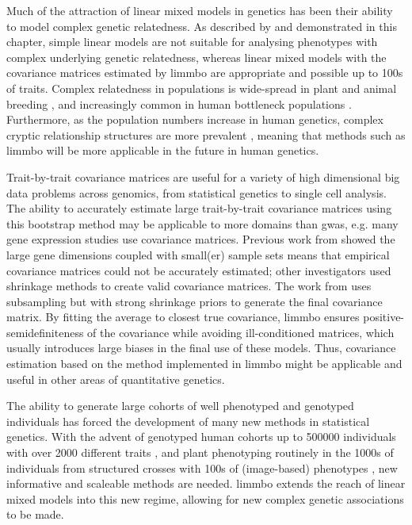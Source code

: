 Much of the attraction of linear mixed models in genetics has been their ability to model complex genetic relatedness. As described by \citep{Kang2010} and demonstrated in this chapter, simple linear models are not suitable for analysing phenotypes with complex underlying genetic relatedness, whereas linear mixed models with the covariance matrices estimated by \gls{limmbo} are appropriate and possible up to \num{100}s of traits. Complex relatedness in populations is wide-spread in plant and animal breeding \citep{Bolormaa2014,Yang2014}, and increasingly common in human bottleneck populations \citep{Tachmazidou2013}. Furthermore, as the population numbers increase in human genetics, complex cryptic relationship structures are more prevalent \citep{Reich2001}, meaning that methods such as \gls{limmbo} will be more applicable in the future in human genetics. 

Trait-by-trait covariance matrices are useful for a variety of high dimensional big data problems across genomics, from statistical genetics to single cell analysis. The ability to accurately estimate large trait-by-trait covariance matrices using this bootstrap method may be applicable to more domains than \gls{gwas}, e.g. many gene expression studies use covariance matrices. Previous work from \citet{Schaefer2005} showed the large gene dimensions coupled with small(er) sample sets means that empirical covariance matrices could not be accurately estimated; other investigators \citep{Ledoit2004,Furrer2007,Bickel2008} used shrinkage methods to create valid covariance matrices. The work from \citet{Teng2009} uses subsampling but with strong shrinkage priors to generate the final covariance matrix. By fitting the average to closest true covariance, \gls{limmbo} ensures positive-semidefiniteness of the covariance while avoiding ill-conditioned matrices, which usually introduces large biases in the final use of these models. Thus, covariance estimation based on the method implemented in \gls{limmbo} might be applicable and useful in other areas of quantitative genetics.  

The ability to generate large cohorts of well phenotyped and genotyped individuals has forced the development of many new methods in statistical genetics. With the advent of genotyped human cohorts up to \num{500000} individuals with over \num{2000} different traits \citep{Sudlow2015}, and plant phenotyping routinely in the \num{1000}s of individuals from structured crosses with \num{100}s of (image-based) phenotypes \citep{Atwell2010,Yang2014}, new informative and scaleable methods are needed. \gls{limmbo} extends the reach of linear mixed models into this new regime, allowing for new complex genetic associations to be made.
